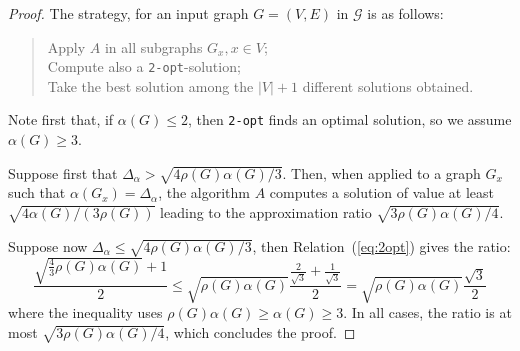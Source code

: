 \documentclass[final]{dmtcs-episciences}
\begin{document}
 \begin{proof}
 The strategy, for an input graph $G=(V,E)$ in $\mathcal{G}$ is as follows: 
 \begin{quote}
  Apply $A$ in all subgraphs $G_x, x\in V$;\\ 
  Compute also a {\tt 2-opt}-solution;\\
 Take the best solution among the $|V|+1$ different solutions obtained.
  \end{quote}
  Note first that, if $\alpha(G)\leq 2$, then {\tt 2-opt} finds an optimal solution, so we assume $\alpha(G)\geq 3$.
  
Suppose first that $\Delta_\alpha> \sqrt{4\rho(G)\alpha(G)/3}$. Then, when applied to a graph $G_x$ such that $\alpha(G_x)=\Delta_\alpha$, the algorithm $A$ computes a solution of value at least $\sqrt{4\alpha(G)/(3\rho(G))}$ leading to the approximation ratio  $\sqrt{3\rho(G)\alpha(G)/4}$.

Suppose now $\Delta_\alpha\leq \sqrt{4\rho(G)\alpha(G)/3}$, then Relation~(\ref{eq:2opt}) gives the ratio: 
$$\frac{\sqrt{\frac{4}{3}\rho(G)\alpha(G)}+1}{2}
\leq 
\sqrt{\rho(G)\alpha(G)}\frac{\frac{2}{\sqrt{3}}+\frac{1}{\sqrt{3}}}{2}=
\sqrt{\rho(G)\alpha(G)}\frac{\sqrt{3}}{2}
$$
where the inequality uses $\rho(G)\alpha(G)\geq\alpha(G)\geq 3$. 
In all cases, the ratio is at most $\sqrt{3\rho(G)\alpha(G)/4}$,
 which concludes the proof.
\end{proof}
\end{document}
